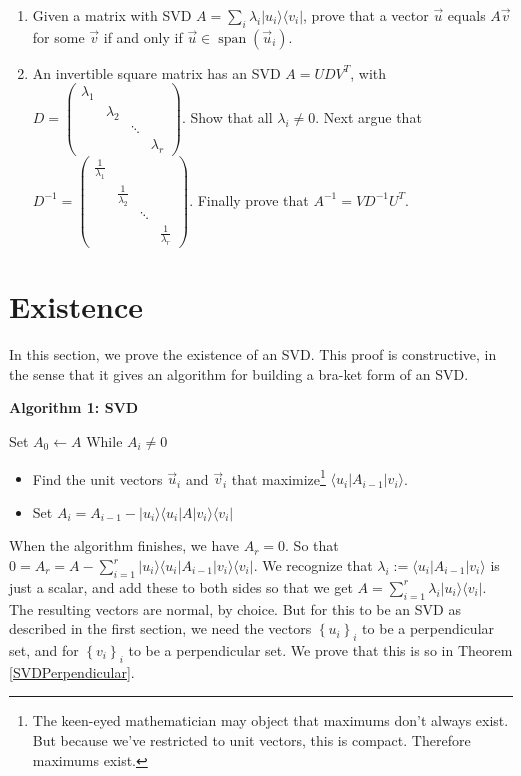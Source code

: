 \documentclass{amsbook}
\begin{document}
\begin{enumerate}
\item \label{Ex-SVD Range} Given a matrix with SVD $A=\sum_i\lambda_i|u_i\rangle\langle v_i|$, prove that a vector $\vec u$ equals $A\vec v$ for some $\vec v$ if and only if $\vec u\in\operatorname{span}\left(\vec u_i\right)$.
\item An invertible square matrix has an SVD $A=UDV^T$, with $D=\left(\begin{array}{cccc}\lambda_1&&&\\ &\lambda_2&&\\ &&\ddots&\\ &&&\lambda_r\end{array}\right)$.  Show that all $\lambda_i\neq0$.  Next argue that $D^{-1}=\left(\begin{array}{cccc}\frac{1}{\lambda_1}&&&\\&\frac{1}{\lambda_2}&&\\&&\ddots&\\&&&\frac{1}{\lambda_r}\end{array}\right)$.  Finally prove that $A^{-1}=VD^{-1}U^T$.
\end{enumerate}

\section{Existence}

In this section, we prove the existence of an SVD.  This proof is constructive, in the sense that it gives an algorithm for building a bra-ket form of an SVD.

\begin{tcolorbox}[title=Algorithm 1: SVD,colback=blue!5]
{\bfseries\Large Algorithm 1: SVD}\label{Algorithm1}

Set $A_0 \gets A$
While $A_i\neq 0$
\begin{itemize}
	\item Find the unit vectors $\vec u _i$ and $\vec v _i$ that maximize\footnote{The keen-eyed mathematician may object that maximums don't always exist.  But because we've restricted to unit vectors, this is compact.  Therefore maximums exist.} $\langle u _i|A_{i-1}| v _i\rangle$.
	\item Set $A_i = A_{i-1}-| u _i\rangle\langle u _i|A| v _i\rangle\langle v _i|$
\end{itemize}
\end{tcolorbox}

When the algorithm finishes, we have $A_r=0$.  So that $0=A_r=A-\sum_{i=1}^r| u _i\rangle\langle u _i|A_{i-1}| v _i\rangle\langle v _i|$.  We recognize that $\lambda_i:=\langle u _i|A_{i-1}| v _i\rangle$ is just a scalar, and add these to both sides so that we get $A=\sum_{i=1}^r\lambda_i| u _i\rangle\langle v _i|$.  The resulting vectors are normal, by choice.  But for this to be an SVD as described in the first section, we need the vectors $\left\{u_i\right\}_i$ to be a perpendicular set, and for $\left\{v_i\right\}_i$ to be a perpendicular set.  We prove that this is so in Theorem \ref{SVDPerpendicular}.
\end{document}
